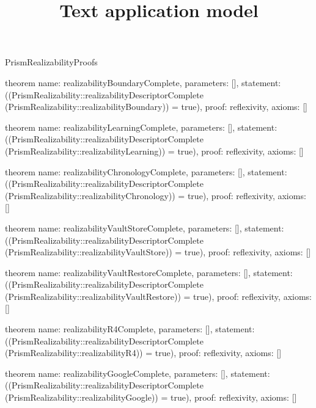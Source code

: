 \begin{lexlean}{PrismRealizabilityProofs}
\title{Text application model}
\begin{semanticmodule}
theorem{
  name: realizabilityBoundaryComplete,
  parameters: [],
  statement: ((PrismRealizability::realizabilityDescriptorComplete (PrismRealizability::realizabilityBoundary)) = true),
  proof: reflexivity{},
  axioms: []
}

theorem{
  name: realizabilityLearningComplete,
  parameters: [],
  statement: ((PrismRealizability::realizabilityDescriptorComplete (PrismRealizability::realizabilityLearning)) = true),
  proof: reflexivity{},
  axioms: []
}

theorem{
  name: realizabilityChronologyComplete,
  parameters: [],
  statement: ((PrismRealizability::realizabilityDescriptorComplete (PrismRealizability::realizabilityChronology)) = true),
  proof: reflexivity{},
  axioms: []
}

theorem{
  name: realizabilityVaultStoreComplete,
  parameters: [],
  statement: ((PrismRealizability::realizabilityDescriptorComplete (PrismRealizability::realizabilityVaultStore)) = true),
  proof: reflexivity{},
  axioms: []
}

theorem{
  name: realizabilityVaultRestoreComplete,
  parameters: [],
  statement: ((PrismRealizability::realizabilityDescriptorComplete (PrismRealizability::realizabilityVaultRestore)) = true),
  proof: reflexivity{},
  axioms: []
}

theorem{
  name: realizabilityR4Complete,
  parameters: [],
  statement: ((PrismRealizability::realizabilityDescriptorComplete (PrismRealizability::realizabilityR4)) = true),
  proof: reflexivity{},
  axioms: []
}

theorem{
  name: realizabilityGoogleComplete,
  parameters: [],
  statement: ((PrismRealizability::realizabilityDescriptorComplete (PrismRealizability::realizabilityGoogle)) = true),
  proof: reflexivity{},
  axioms: []
}


\end{semanticmodule}
\end{lexlean}
